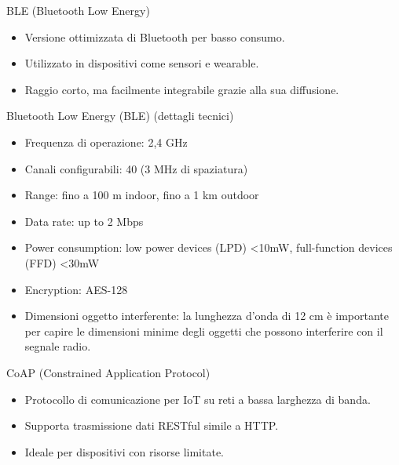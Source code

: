 \documentclass{beamer}
\begin{document}
	\begin{frame}{BLE (Bluetooth Low Energy)}
		\begin{itemize}
			\item Versione ottimizzata di Bluetooth per basso consumo.
			\item Utilizzato in dispositivi come sensori e wearable.
			\item Raggio corto, ma facilmente integrabile grazie alla sua diffusione.
		\end{itemize}
	\end{frame}
	\begin{frame}{Bluetooth Low Energy (BLE) (dettagli tecnici)}
		\begin{itemize}
			\item Frequenza di operazione: 2,4 GHz
			\item Canali configurabili: 40 (3 MHz di spaziatura)
			\item Range: fino a 100 m indoor, fino a 1 km outdoor
			\item Data rate: up to 2 Mbps
			\item Power consumption: low power devices (LPD) <10mW, full-function devices (FFD) <30mW
			\item Encryption: AES-128
			\item Dimensioni oggetto interferente: la lunghezza d'onda di 12 cm è importante per capire le dimensioni minime degli oggetti che possono interferire con il segnale radio.
		\end{itemize}
	\end{frame}
	
	\begin{frame}{CoAP (Constrained Application Protocol)}
		\begin{itemize}
			\item Protocollo di comunicazione per IoT su reti a bassa larghezza di banda.
			\item Supporta trasmissione dati RESTful simile a HTTP.
			\item Ideale per dispositivi con risorse limitate.
		\end{itemize}
	\end{frame}
	
\end{document}
